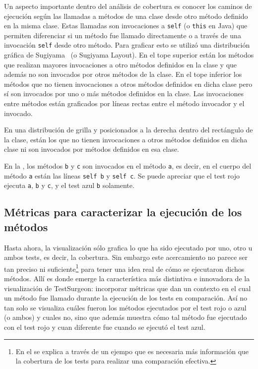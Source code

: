 \par Un aspecto importante dentro del análisis de cobertura es conocer los caminos de ejecución según las llamadas a métodos de una clase desde otro método definido en la misma clase. Estas llamadas son invocaciones a {\tt self} (o {\tt this} en Java) que permiten diferenciar si un método fue llamado directamente o a través de una invocación {\tt self} desde otro método. Para graficar esto se utilizó una distribución gráfica de Sugiyama~\cite{sugiyama1981methods} (o Sugiyama Layout). En el tope superior están los métodos que realizan mayores invocaciones a otro métodos definidos en la clase y que además no son invocados por otros métodos de la clase. En el tope inferior los métodos que no tienen invocaciones a otros métodos definidos en dicha clase pero sí son invocados por uno o más métodos definidos en la clase. Las invocaciones entre métodos están graficados por líneas rectas entre el método invocador y el invocado.

\par En una distribución de grilla y posicionados a la derecha dentro del rectángulo de la clase, están los que no tienen invocaciones a otros métodos definidos en dicha clase ni son invocados por métodos definidos en esa clase.


\par En la , los métodos {\tt b} y {\tt c} son invocados en el método {\tt a}, es decir, en el cuerpo del método {\tt a} están las líneas {\tt self b} y {\tt self c}. Se puede apreciar que el test rojo ejecuta {\tt a}, {\tt b} y {\tt c}, y el test azul {\tt b} solamente. 

\subsection{Métricas para caracterizar la ejecución de los métodos }

\par Hasta ahora, la visualización sólo grafica lo que ha sido ejecutado por uno, otro u ambos tests, es decir, la cobertura. Sin embargo este acercamiento no parece ser tan preciso ni suficiente\footnote{En el  se explica a través de un ejempo que es necesaria más información que la cobertura de los tests para realizar una comparación efectiva.} para tener una idea real de cómo se ejecutaron dichos métodos. Allí es donde emerge la característica más distintiva e innovadora de la visualización de TestSurgeon: incorporar métricas que dan un contexto en el cual un método fue llamado durante la ejecución de los tests en comparación. Así no tan solo se visualiza cuáles fueron los métodos ejecutados por el test rojo o azul (o ambos) y cuales no, sino que además muestra cómo tal método fue ejecutado con el test rojo y cuan diferente fue cuando se ejecutó el test azul.

